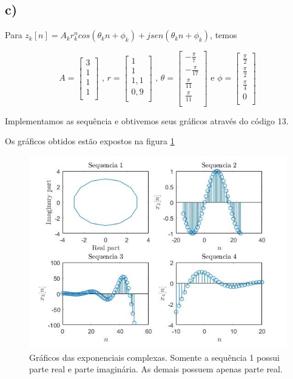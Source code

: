\documentclass[a4paper, 12pt]{article}
\begin{document}
\subsection{c)}

Para $z_k[n]=A_kr_k^ncos(\theta_k n + \phi_k) + jsen(\theta_k n + \phi_k)$, temos

$$
A = \begin{bmatrix}
   	3\\
    1\\
    1\\
    1\\
    \end{bmatrix}
\text{ , } 
r = \begin{bmatrix}
   	1\\
    1\\
    1,1\\
    0,9\\
    \end{bmatrix} 
\text{ , } 
\theta = \begin{bmatrix}
   	-\frac{\pi}{7}\\
    -\frac{\pi}{17}\\
    \frac{\pi}{11}\\
    \frac{\pi}{11}\\
    \end{bmatrix}  
\text{ e } 
\phi = \begin{bmatrix}
   	\frac{\pi}{2}\\
    \frac{\pi}{2}\\
    \frac{\pi}{4}\\
    0\\
    \end{bmatrix} 
$$

Implementamos as sequência e obtivemos seus gráficos através do código 13.



Os gráficos obtidos estão expostos na figura \ref{fig:4c}

\begin{figure}[H]
	\centering
	\includegraphics[scale=0.7]{../Imagens/ex4/c.jpg}  
	\caption{Gráficos das exponenciais complexas. Somente a sequência 1 possui parte real e parte imaginária. As demais possuem apenas parte real.}
	\label{fig:4c}
\end{figure}
\end{document}
